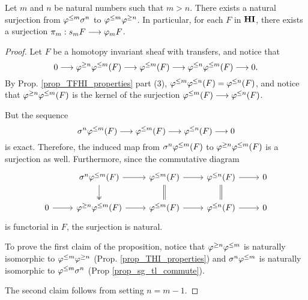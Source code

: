 \begin{prop}\label{prop_struct_consts}
Let $m$ and $n$ be natural numbers such that $m > n$. There exists 
a natural surjection from $\varphi^{\leq m} \sigma^{n}$ to $\varphi^{\leq m} 
\varphi^{\geq n}$. In particular, for each $F$ in $\mathbf{HI}$, there exists a 
surjection $\pi_m: s_m F \longrightarrow \varphi_{m} F$.
\end{prop}
\begin{proof}
Let $F$ be a homotopy invariant sheaf with transfers, and notice that
\[
0 \longrightarrow \varphi^{\geq n} \varphi^{\leq m}(F) \longrightarrow \varphi^{\leq m}(F) \longrightarrow 
  \varphi^{\leq n} \varphi^{\leq m}(F) \longrightarrow 0.
\]
By Prop. \ref{prop_TFHI_properties} part (3), $\varphi^{\leq m} \varphi^{\leq n}(F) 
= \varphi^{\leq n}(F)$, and notice that $\varphi^{\geq n} \varphi^{\leq m}(F)$ is the kernel 
of the surjection $\varphi^{\leq m}(F) \longrightarrow \varphi^{\leq n}(F)$.

But the sequence
\[
\sigma^{n} \varphi^{\leq m}(F) \longrightarrow \varphi^{\leq m}(F) \longrightarrow \varphi^{\leq n}(F) \longrightarrow 0
\]
is exact. Therefore, the induced map from $\sigma^{n} \varphi^{\leq m}(F)$
to $\varphi^{\geq n} \varphi^{\leq m}(F)$ is a surjection as well. Furthermore,
since the commutative diagram
\[
\begin{tikzcd}
{} & \sgHI{n} \tlHI{m}(F) \arrow{r} \arrow[twoheadrightarrow]{d} &
\tlHI{m}(F) \arrow{r} \arrow[equal]{d} &
\tlHI{n}(F) \arrow{r} \arrow[equal]{d} &
0 \\
0 \arrow{r} &
\tgHI{n} \tlHI{m}(F) \arrow{r} &
\tlHI{m}(F) \arrow{r} &
\tlHI{n}(F) \arrow{r} &
0
\end{tikzcd}
\] 
is functorial in $F$, the surjection is natural.

To prove the first claim of the proposition, notice that 
$\varphi^{\geq n} \varphi^{\leq m}$ is naturally isomorphic to $\varphi^{\leq m} \varphi^{\geq n}$ 
(Prop. \ref{prop_THI_properties}) and $\sigma^{n} \varphi^{\leq m}$ is 
naturally isomorphic to $\varphi^{\leq m} \sigma^{n}$ (Prop 
\ref{prop_sg_tl_commute}).

The second claim follows from setting $n = m - 1$.
\end{proof}
